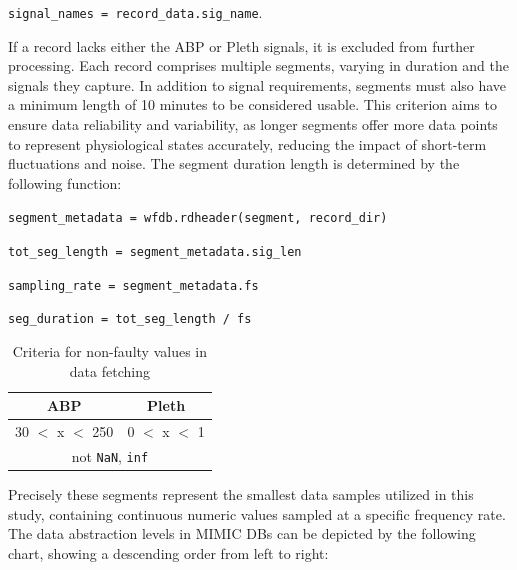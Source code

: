 \vspace{0.1cm}
{\centering \texttt{signal\_names = record\_data.sig\_name}.\par}
\vspace{0.1cm}

\noindent If a record lacks either the ABP or Pleth signals, it is excluded from further processing.
Each record comprises multiple segments, varying in duration and the signals they capture.
In addition to signal requirements, segments must also have a minimum length of 10 minutes to be considered usable.
This criterion aims to ensure data reliability and variability, as longer segments offer more data points to represent physiological states accurately, reducing the impact of short-term fluctuations and noise.
The segment duration length is determined by the following function:

\vspace{0.1cm}
\qquad\qquad\qquad \texttt{segment\_metadata = wfdb.rdheader(segment, record\_dir)}

\qquad\qquad\qquad \texttt{tot\_seg\_length = segment\_metadata.sig\_len}

\qquad\qquad\qquad \texttt{sampling\_rate = segment\_metadata.fs}

\qquad\qquad\qquad \texttt{seg\_duration = tot\_seg\_length / fs}

\begin{table}
    \vspace{-1cm}
    \begin{center}
        \begin{tabular}{ |c|c| }
            \hline
            ABP              & Pleth         \\
            \hline
            30 $<$ x $<$ 250 & 0 $<$ x $<$ 1 \\
            \hline
            \multicolumn{2}{|c|}{not \texttt{NaN}, \texttt{inf}} \\
            \hline
        \end{tabular}
    \end{center}
    \vspace*{-7mm}
    \captionsetup{format=plain, justification=centering, font=small}
    \caption{Criteria for non-faulty values in data fetching}
    \label{tab:faulty}
\end{table}

\noindent Precisely these segments represent the smallest data samples utilized in this study, containing continuous numeric values sampled at a specific frequency rate.
The data abstraction levels in MIMIC DBs can be depicted by the following chart, showing a descending order from left to right:

